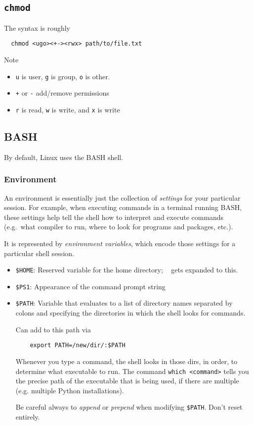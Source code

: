 \documentclass[12pt]{article}
\theoremstyle{plain}
\theoremstyle{definition}
\theoremstyle{remark}
\begin{document}
\clearpage
\subsection{\texttt{chmod}}

The syntax is roughly
\begin{lstlisting}
  chmod <ugo><+-><rwx> path/to/file.txt
\end{lstlisting}
Note
\begin{itemize}
  \item \texttt{u} is user, \texttt{g} is group, \texttt{o} is other.
  \item \texttt{+} or \texttt{-} add/remove permissions
  \item \texttt{r} is read, \texttt{w} is write, and \texttt{x} is
    write
\end{itemize}


\clearpage
\subsection{BASH}

 By default, Linux uses the BASH shell.


\subsubsection{Environment}

An environment is essentially just the collection of \emph{settings} for
your particular session.
For example, when executing commands in a terminal running BASH, these
settings help tell the shell how to interpret and execute commands
(e.g.\ what compiler to run, where to look for programs and packages,
etc.).

It is represented by \emph{environment variables}, which encode those
settings for a particular shell session.
\begin{itemize}
  \item \texttt{\$HOME}:
    Reserved variable for the home directory;
    \texttt{~} gets expanded to this.
  \item \texttt{\$PS1}: Appearance of the command prompt string
  \item \texttt{\$PATH}:
    Variable that evaluates to a list of directory names separated by
    colons and specifying the directories in which the shell looks for
    commands.

    Can add to this path via
    \lstset{style=bash}
    \begin{lstlisting}
    export PATH=/new/dir/:$PATH
    \end{lstlisting}
    Whenever you type a command, the shell looks in those dirs, in
    order, to determine what executable to run.
    The command
    \texttt{which <command>}
    tells you the precise path of the executable that is being used, if
    there are multiple (e.g. multiple Python installations).

    Be careful always to \emph{append} or \emph{prepend} when modifying
    \texttt{\$PATH}. Don't reset entirely.
\end{itemize}
\end{document}
